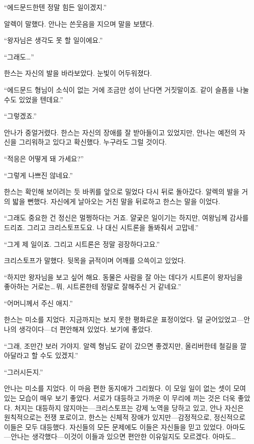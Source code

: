 ``에드문드한텐 정말 힘든 일이겠지.''

알렉이 말했다. 안나는 쓴웃음을 지으며 말을 보탰다.

``왕자님은 생각도 못 할 일이에요.''

``그래도\ldots''

한스는 자신의 발을 바라보았다. 눈빛이 어두워졌다.

``에드문드 형님이 소식이 없는 거에 조금만 성이 난다면 거짓말이죠. 같이 슬픔을 나눌 수도 있었을 텐데요.''

``그렇겠죠.''

안나가 중얼거렸다. 한스는 자신의 장애를 잘 받아들이고 있었지만, 안나는 예전의 자신을 그리워하고 있다고 확신했다. 누구라도 그럴 것이다.

``적응은 어떻게 돼 가세요?''

``그렇게 나쁘진 않네요.''

한스는 확인해 보이려는 듯 바퀴를 앞으로 밀었다 다시 뒤로 돌아갔다. 알렉의 발을 거의 밟을 뻔했다. 자신에게 날아오는 거친 말을 뒤로하고 한스는 말을 이었다.

``그래도 중요한 건 정신은 멀쩡하다는 거죠. 얄궂은 일이기는 하지만, 여왕님께 감사를 드리죠. 그리고 크리스토프도요. 나 대신 시트론을 돌봐줘서 고맙네.''

``그게 제 일이죠. 그리고 시트론은 정말 굉장하다고요.''

크리스토프가 말했다. 뒷목을 긁적이며 어깨를 으쓱이고 있었다.

``하지만 왕자님을 보고 싶어 해요. 동물은 사람을 잘 아는 데다가 시트론이 왕자님을 좋아하는 거로는\ldots\,뭐, 시트론한테 정말로 잘해주신 거 같네요.''

``어머니께서 주신 애지.''

한스는 미소를 지었다. 지금까지는 보지 못한 평화로운 표정이었다. 덜 굳어있었고—안나의 생각이다—더 편안해져 있었다. 보기에 좋았다.

``그래, 조만간 보러 가야지. 알렉 형님도 같이 갔으면 좋겠지만, 올리버한테 철길을 깔아달라고 할 수도 있겠지.''

``그러시든지.''

안나는 미소를 지었다. 이 마음 편한 동지애가 그리웠다. 이 모일 일이 없는 셋이 모여 있는 모습이 매우 보기 좋았다. 서로가 대등하고 가까운 이 무리에 끼는 것은 더욱 좋았다. 처지는 대등하지 않지마는—크리스토프는 강제 노역을 당하고 있고, 안나 자신은 원칙적으로는 전쟁 포로이고, 한스는 신체적 장애가 있지만—감정적으로, 정신적으로 이들은 모두 대등했다. 자신들의 모든 문제에도 이들은 자신들을 믿고 있었다. 아마도—안나는 생각했다—이것이 이들과 있으면 편안한 이유일지도 모르겠다. 아마도\ldots

